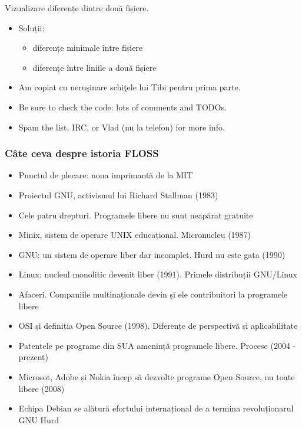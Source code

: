 \documentclass{beamer}
\begin{document}
\begin{frame}{Vizualizare diferențe dintre două fișiere.}
\begin{itemize} %
\item Soluții:
  \begin{itemize}
  \item diferențe minimale între fișiere
  \item diferențe între liniile a două fișiere
  \end{itemize}
\item Am copiat cu neruşinare schiţele lui Tibi pentru prima parte.
\item Be sure to check the code: lots of comments and TODOs.
\item Spam the list, IRC, or Vlad (nu la telefon) for more info.
\end{itemize}
\end{frame}

\begin{frame}[allowframebreaks] %
\frametitle{Câte ceva despre istoria FLOSS}
\begin{itemize}
\item Punctul de plecare: noua imprimantă de la MIT
\item Proiectul GNU, activismul lui Richard Stallman (1983)
\item Cele patru drepturi. Programele libere nu sunt neapărat gratuite
\item Minix, sistem de operare UNIX educațional. Micronucleu (1987)
\item GNU: un sistem de operare liber dar incomplet. Hurd nu este gata (1990)
\item Linux: nucleul monolitic devenit liber (1991). Primele distribuții
GNU/Linux
\item Afaceri. Companiile multinaționale devin și ele contribuitori la
programele libere
\item OSI și definiția Open Source (1998). Diferențe de perspectivă și
aplicabilitate
\item Patentele pe programe din SUA amenință programele libere. Procese (2004
- prezent)
\item Microsot, Adobe și Nokia încep să dezvolte programe Open Source, nu
toate libere (2008)
\item Echipa Debian se alătură efortului internațional de a termina
revoluționarul GNU Hurd
\end{itemize}
\end{frame}
\end{document}
